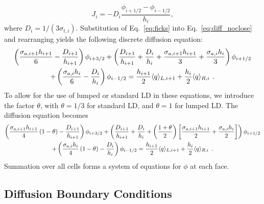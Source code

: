 \begin{equation}\label{eq:ficks}
    J_{i} = -D_i \frac{\phi_{i+1/2} - \phi_{i-1/2}}{h_i},
\end{equation}
where $D_i = 1/(3\sigma_{t,i})$.
Substitution of Eq.~\eqref{eq:ficks} into Eq.~\eqref{eq:diff_noclose} and rearranging yields the following discrete diffusion
equation:
\begin{multline}
        \left(\frac{\sigma_{a,i+1} h_{i+1}}{6} -
        \frac{D_{i+1}}{h_{i+1}}\right)\phi_{i+3/2} + \left(\frac{D_{i+1}}{h_{i+1}} +
        \frac{D_{i}}{h_i} + \frac{\sigma_{a,i+1} h_{i+1}}{3} + \frac{\sigma_{a,i}
        h_{i}}{3}\right)\phi_{i+1/2} \\ + \left(\frac{\sigma_{a,i} h_{i}}{6} -
        \frac{D_{i}}{h_{i}}\right)\phi_{i-1/2} = \frac{h_{i+1}}{2} \langle q \rangle_{L,i+1} +
        \frac{h_{i}}{2}\langle q \rangle_{R,i}\;\,. 
\end{multline}
To allow for the use of lumped
or standard LD in these equations, we introduce the factor $\theta$, with
$\theta=1/3$ for standard
LD, and $\theta=1$ for lumped LD.  The diffusion equation becomes
\begin{multline}\label{eq:dsa_lumped_app}
    \left(\frac{\sigma_{a,i+1} h_{i+1}}{4}\left(1 - \theta\right)  -
        \frac{D_{i+1}}{h_{i+1}}\right)\phi_{i+3/2} + \left(\frac{D_{i+1}}{h_{i+1}} +
        \frac{D_{i}}{h_i} + \left(\frac{1+\theta}{2} \right)\left[\frac{\sigma_{a,i+1} h_{i+1}}{2} + \frac{\sigma_{a,i}
        h_{i}}{2}\right]\right)\phi_{i+1/2} \\ + \left(\frac{\sigma_{a,i}
        h_{i}}{4}\left(1 - \theta\right) -
        \frac{D_{i}}{h_{i}}\right)\phi_{i-1/2} = \frac{h_{i+1}}{2} \langle q \rangle_{L,i+1} +
        \frac{h_{i}}{2}\langle q \rangle_{R,i}
        \;\,. 
\end{multline}
Summation over all cells forms a system of equations for $\phi$ at each face.  

\subsection{Diffusion Boundary Conditions}


